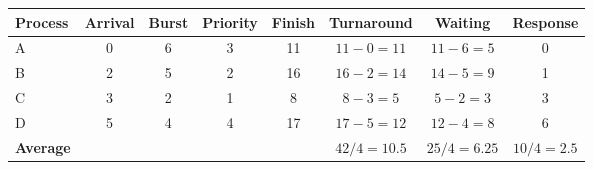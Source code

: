 \begin{tabular}{@{}lccccccc@{}}
\toprule
\textbf{Process} & \textbf{Arrival} & \textbf{Burst} & \textbf{Priority} & \textbf{Finish} & \textbf{Turnaround} & \textbf{Waiting} & \textbf{Response}\\
\midrule
A & 0 & 6 & 3 & 11 & $11-0=11$ & $11-6=5$ & 0\\
B & 2 & 5 & 2 & 16 & $16-2=14$ & $14-5=9$ & 1\\
C & 3 & 2 & 1 & 8 & $8-3=5$ & $5-2=3$ & 3\\
D & 5 & 4 & 4 & 17 & $17-5=12$ & $12-4=8$ & 6\\
\midrule
\textbf{Average} &  &  &  &  & $42/4=10.5$ & $25/4=6.25$ & $10/4=2.5$\\
\bottomrule
\end{tabular}
